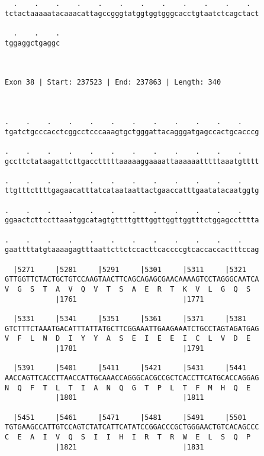 \documentclass{article}
\begin{document}
\begin{Verbatim}
  .    .    .    .    .    .    .    .    .    .    .    .  
tctactaaaaatacaaacattagccgggtatggtggtgggcacctgtaatctcagctact
                                                            
  .    .    .
tggaggctgaggc
             
             
 
Exon 38 | Start: 237523 | End: 237863 | Length: 340



.    .    .    .    .    .    .    .    .    .    .    .    
tgatctgcccacctcggcctcccaaagtgctgggattacagggatgagccactgcacccg
                                                            
.    .    .    .    .    .    .    .    .    .    .    .    
gccttctataagattcttgacctttttaaaaaggaaaattaaaaaatttttaaatgtttt
                                                            
.    .    .    .    .    .    .    .    .    .    .    .    
ttgtttcttttgagaacatttatcataataattactgaaccatttgaatatacaatggtg
                                                            
.    .    .    .    .    .    .    .    .    .    .    .    
ggaactcttccttaaatggcatagtgttttgtttggttggttggtttctggagcctttta
                                                            
.    .    .    .    .    .    .    .    .    .    .    .    
gaattttatgtaaaagagtttaattcttctccacttcaccccgtcaccaccactttccag
                                                            
  |5271     |5281     |5291     |5301     |5311     |5321   
GTTGGTTCTACTGCTGTCCAAGTAACTTCAGCAGAGCGAACAAAAGTCCTAGGGCAATCA
V  G  S  T  A  V  Q  V  T  S  A  E  R  T  K  V  L  G  Q  S  
            |1761                         |1771             
  
  |5331     |5341     |5351     |5361     |5371     |5381   
GTCTTTCTAAATGACATTTATTATGCTTCGGAAATTGAAGAAATCTGCCTAGTAGATGAG
V  F  L  N  D  I  Y  Y  A  S  E  I  E  E  I  C  L  V  D  E  
            |1781                         |1791             
  
  |5391     |5401     |5411     |5421     |5431     |5441   
AACCAGTTCACCTTAACCATTGCAAACCAGGGCACGCCGCTCACCTTCATGCACCAGGAG
N  Q  F  T  L  T  I  A  N  Q  G  T  P  L  T  F  M  H  Q  E  
            |1801                         |1811             
  
  |5451     |5461     |5471     |5481     |5491     |5501   
TGTGAAGCCATTGTCCAGTCTATCATTCATATCCGGACCCGCTGGGAACTGTCACAGCCC
C  E  A  I  V  Q  S  I  I  H  I  R  T  R  W  E  L  S  Q  P  
            |1821                         |1831             
  

\end{Verbatim}
\end{document}
